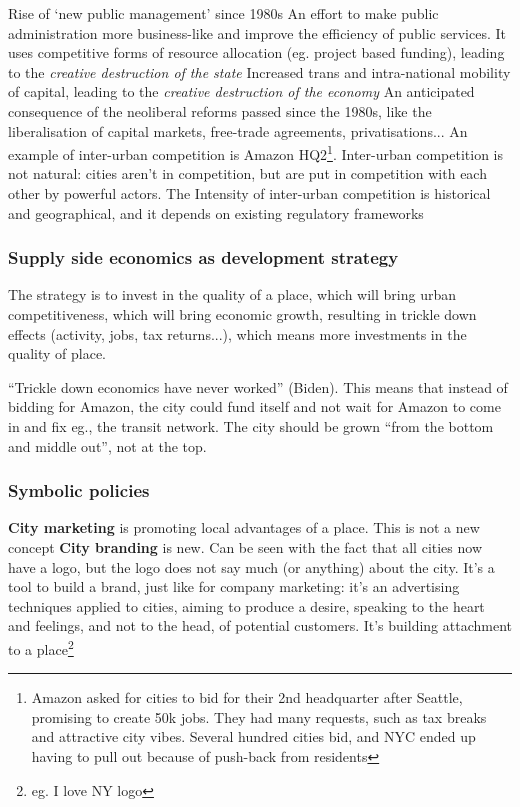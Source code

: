 \documentclass{article}
\begin{document}
\begin{outline}
	\1 Rise of `new public management' since 1980s
		\2 An effort to make public administration more business-like and improve the efficiency of public services. It uses competitive forms of resource allocation (eg. project based funding), leading to the \textit{creative destruction of the state}
	\1 Increased trans and intra-national mobility of capital, leading to the \textit{creative destruction of the economy}
		\2 An anticipated consequence of the neoliberal reforms passed since the 1980s, like the liberalisation of capital markets, free-trade agreements, privatisations...
		\2 An example of inter-urban competition is Amazon HQ2\footnote{Amazon asked for cities to bid for their 2nd headquarter after Seattle, promising to create 50k jobs. They had many requests, such as tax breaks and attractive city vibes. Several hundred cities bid, and NYC ended up having to pull out because of push-back from residents}. Inter-urban competition is not natural: cities aren't in competition, but are put in competition with each other by powerful actors.
		\2 The Intensity of inter-urban competition is historical and geographical, and it depends on existing regulatory frameworks
\end{outline}
	
\subsubsection{Supply side economics as development strategy}

The strategy is to invest in the quality of a place, which will bring urban competitiveness, which will bring economic growth, resulting in trickle down effects (activity, jobs, tax returns...), which means more investments in the quality of place.

``Trickle down economics have never worked'' (Biden). This means that instead of bidding for Amazon, the city could fund itself and not wait for Amazon to come in and fix eg., the transit network. The city should be grown ``from the bottom and middle out'', not at the top.

\subsubsection{Symbolic policies}

\textbf{City marketing} is promoting local advantages of a place. This is not a new concept
\textbf{City branding} is new. Can be seen with the fact that all cities now have a logo, but the logo does not say much (or anything) about the city. It's a tool to build a brand, just like for company marketing: it's an advertising techniques applied to cities, aiming to produce a desire, speaking to the heart and feelings, and not to the head, of potential customers. It's building attachment to a place\footnote{eg. I love NY logo} 
\end{document}
